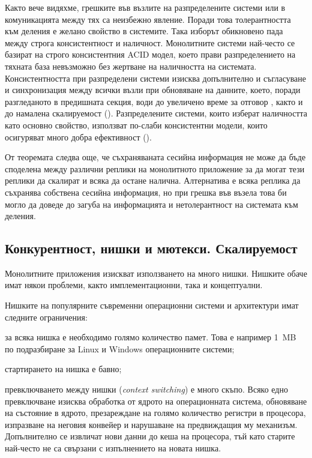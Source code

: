 Както вече видяхме, грешките във възлите на разпределените системи или в комуникацията между тях са неизбежно явление. Поради това толерантността към деления е желано свойство в системите. Така изборът обикновено пада между строга консистентност и наличност. Монолитните системи най-често се базират на строго консистентния ACID модел, което прави разпределението на тяхната база невъзможно без жертване на наличността на системата. Консистентността при разпределени системи изисква допълнително и съгласуване и синхронизация между всички възли при обновяване на данните, което, поради разгледаното в предишната секция, води до увеличено време за отговор \cite{lloyd2014CAPAndConsistency}, както и до намалена скалируемост (). Разпределените системи, които изберат наличността като основно свойство, използват по-слаби консистентни модели, които осигуряват много добра ефективност ().

От теоремата следва още, че съхраняваната сесийна информация не може да бъде споделена между различни реплики на монолитното приложение за да могат тези реплики да скалират и всяка да остане налична. Алтернатива е всяка реплика да съхранява собствена сесийна информация, но при грешка във възела това би могло да доведе до загуба на информацията и нетолерантност на системата към деления.

\subsection{Конкурентност, нишки и мютекси. Скалируемост}
\label{sec:concurrency-threads-scalability}

Монолитните приложения изискват използването на много нишки. Нишките обаче имат някои проблеми, както имплементационни, така и концептуални.

Нишките на популярните съвременни операционни системи и архитектури имат следните ограничения:

\begin{itemize*}
  \item за всяка нишка е необходимо голямо количество памет. Това е например 1~MB по подразбиране за Linux и Windows операционните системи;
  \item стартирането на нишка е бавно;
  \item превключването между нишки (\emph{context switching}) е много скъпо. Всяко едно превключване изисква обработка от ядрото на операционната система, обновяване на състояние в ядрото, презареждане на голямо количество регистри в процесора, изпразване на неговия конвейер и нарушаване на предвиждащия му механизъм. Допълнително се извличат нови данни до кеша на процесора, тъй като старите най-често не са свързани с изпълнението на новата нишка.
\end{itemize*} 


